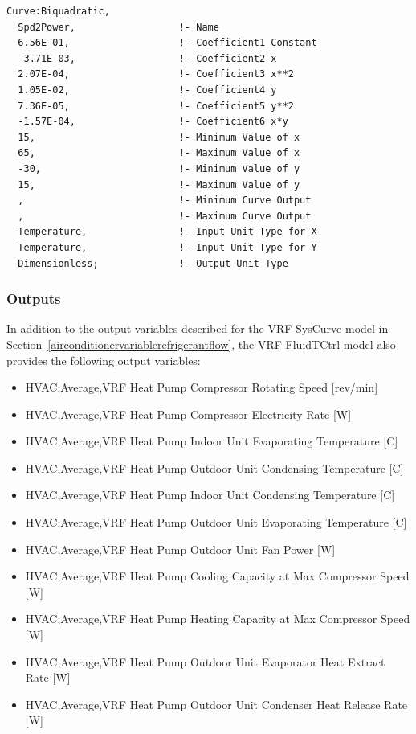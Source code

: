 \begin{lstlisting}
Curve:Biquadratic,
  Spd2Power,                  !- Name
  6.56E-01,                   !- Coefficient1 Constant
  -3.71E-03,                  !- Coefficient2 x
  2.07E-04,                   !- Coefficient3 x**2
  1.05E-02,                   !- Coefficient4 y
  7.36E-05,                   !- Coefficient5 y**2
  -1.57E-04,                  !- Coefficient6 x*y
  15,                         !- Minimum Value of x
  65,                         !- Maximum Value of x
  -30,                        !- Minimum Value of y
  15,                         !- Maximum Value of y
  ,                           !- Minimum Curve Output
  ,                           !- Maximum Curve Output
  Temperature,                !- Input Unit Type for X
  Temperature,                !- Input Unit Type for Y
  Dimensionless;              !- Output Unit Type
\end{lstlisting}

\subsubsection{Outputs}

In addition to the output variables described for the VRF-SysCurve model in Section~\ref{airconditionervariablerefrigerantflow}, the VRF-FluidTCtrl model also provides the following output variables:

\begin{itemize}
\item
  HVAC,Average,VRF Heat Pump Compressor Rotating Speed {[}rev/min{]}
\item
  HVAC,Average,VRF Heat Pump Compressor Electricity Rate {[}W{]}
\item
  HVAC,Average,VRF Heat Pump Indoor Unit Evaporating Temperature {[}C{]}
\item
  HVAC,Average,VRF Heat Pump Outdoor Unit Condensing Temperature {[}C{]}
\item
  HVAC,Average,VRF Heat Pump Indoor Unit Condensing Temperature {[}C{]}
\item
  HVAC,Average,VRF Heat Pump Outdoor Unit Evaporating Temperature {[}C{]}
\item
  HVAC,Average,VRF Heat Pump Outdoor Unit Fan Power {[}W{]}
\item
  HVAC,Average,VRF Heat Pump Cooling Capacity at Max Compressor Speed {[}W{]}
\item
  HVAC,Average,VRF Heat Pump Heating Capacity at Max Compressor Speed {[}W{]}
\item
  HVAC,Average,VRF Heat Pump Outdoor Unit Evaporator Heat Extract Rate {[}W{]}
\item
  HVAC,Average,VRF Heat Pump Outdoor Unit Condenser Heat Release Rate {[}W{]}
\end{itemize}

